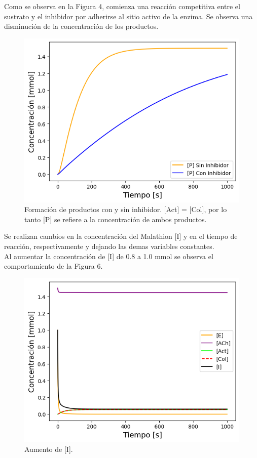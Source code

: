 Como se observa en la Figura 4, comienza una reacción competitiva entre el sustrato y el inhibidor por adherirse al sitio activo de la enzima. Se observa una disminución de la concentración de los productos.\\

\begin{figure}[h]
	\centering
	\includegraphics[width=\columnwidth]{img/simucomp.png}
	\caption{Formación de productos con y sin inhibidor. [Act] = [Col], por lo tanto [P] se refiere a la concentración de ambos productos.}
	\label{5}
\end{figure}

Se realizan cambios en la concentración del Malathion [I] y en el tiempo de reacción, respectivamente y dejando las demas variables constantes.\\

Al aumentar la concentración de [I] de 0.8 a 1.0 mmol se observa el comportamiento de la Figura 6.

\begin{figure}[h]
	\centering
	\includegraphics[width=\columnwidth]{img/masconc.png}
	\caption{Aumento de [I].}
	\label{6}
\end{figure}

